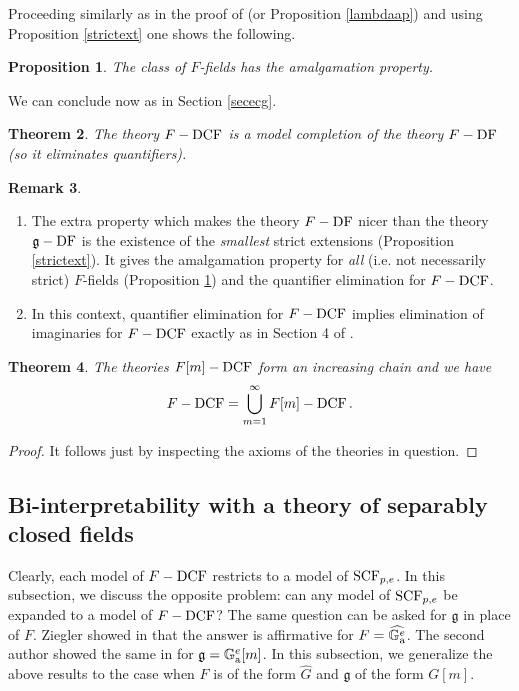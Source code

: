 \documentclass[10pt]{amsart}
\newtheorem{theorem}{Theorem}[section]
\newtheorem{prop}[theorem]{Proposition}
\theoremstyle{definition}
\newtheorem{remark}[theorem]{Remark}
\begin{document}
\noindent
Proceeding similarly as in the proof of \cite[Prop. 2.6]{Zieg2} (or Proposition \ref{lambdaap}) and using Proposition \ref{strictext} one shows the following.
\begin{prop}\label{apf}
The class of $F$-fields has the amalgamation property.
\end{prop}
\noindent
We can conclude now as in Section \ref{sececg}.
\begin{theorem}
The theory $F-\operatorname{DCF}$ is a model completion of the theory $F-\operatorname{DF}$ (so it eliminates quantifiers).
\end{theorem}
\begin{remark}
\begin{enumerate}
\item The extra property which makes the theory $F-\operatorname{DF}$ nicer than the theory $\mathfrak{g}-\operatorname{DF}$ is the existence of the \emph{smallest} strict extensions (Proposition \ref{strictext}). It gives the amalgamation property for \emph{all} (i.e. not necessarily strict) $F$-fields (Proposition \ref{apf}) and the quantifier elimination for $F-\operatorname{DCF}$.

\item In this context, quantifier elimination for $F-\operatorname{DCF}$ implies elimination of imaginaries for $F-\operatorname{DCF}$ exactly as in Section 4 of \cite{Zieg2}.
\end{enumerate}
\end{remark}

\begin{theorem}\label{chain}
The theories $F[m]-\operatorname{DCF}$ form an increasing chain and we have
$$F-\operatorname{DCF} = \bigcup_{m=1}^{\infty}F[m]-\operatorname{DCF}.$$
\end{theorem}
\begin{proof}
It follows just by inspecting the axioms of the theories in question.
\end{proof}


\subsection{Bi-interpretability with a theory of separably closed fields}
Clearly, each model of $F-\operatorname{DCF}$ restricts to a model of $\operatorname{SCF}_{p,e}$. In this subsection, we discuss the opposite problem: can any model of $\operatorname{SCF}_{p,e}$ be expanded to a model of $F-\operatorname{DCF}$? The same question can be asked for $\mathfrak{g}$ in place of $F$. Ziegler showed in \cite{Zieg2} that the answer is affirmative for $F=\widehat{\mathbb{G}_{\rm{a}}^e}$. The second author showed the same in \cite{K3} for $\mathfrak{g}=\mathbb{G}_{\rm{a}}^e[m]$. In this subsection, we generalize the above results to the case when $F$ is of the form $\widehat{G}$ and $\mathfrak{g}$ of the form $G[m]$.
\end{document}
